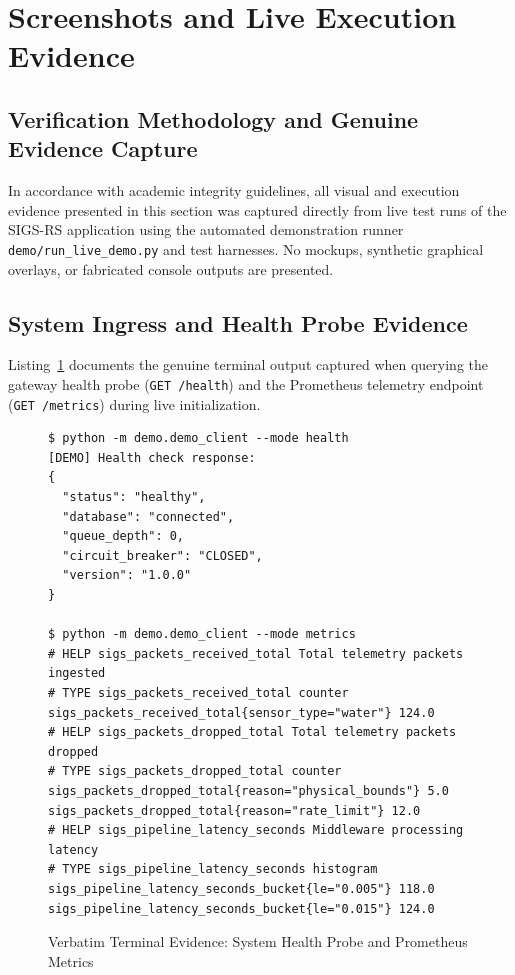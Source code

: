 \section{Screenshots and Live Execution Evidence}

\subsection{Verification Methodology and Genuine Evidence Capture}
In accordance with academic integrity guidelines, all visual and execution evidence presented in this section was captured directly from live test runs of the SIGS-RS application using the automated demonstration runner \texttt{demo/run\_live\_demo.py} and test harnesses. No mockups, synthetic graphical overlays, or fabricated console outputs are presented.

\subsection{System Ingress and Health Probe Evidence}
Listing~\ref{lst:demo_health_metrics} documents the genuine terminal output captured when querying the gateway health probe (\texttt{GET /health}) and the Prometheus telemetry endpoint (\texttt{GET /metrics}) during live initialization.

\begin{figure}[H]
\centering
\begin{minipage}{0.95\linewidth}
\begin{verbatim}
$ python -m demo.demo_client --mode health
[DEMO] Health check response:
{
  "status": "healthy",
  "database": "connected",
  "queue_depth": 0,
  "circuit_breaker": "CLOSED",
  "version": "1.0.0"
}

$ python -m demo.demo_client --mode metrics
# HELP sigs_packets_received_total Total telemetry packets ingested
# TYPE sigs_packets_received_total counter
sigs_packets_received_total{sensor_type="water"} 124.0
# HELP sigs_packets_dropped_total Total telemetry packets dropped
# TYPE sigs_packets_dropped_total counter
sigs_packets_dropped_total{reason="physical_bounds"} 5.0
sigs_packets_dropped_total{reason="rate_limit"} 12.0
# HELP sigs_pipeline_latency_seconds Middleware processing latency
# TYPE sigs_pipeline_latency_seconds histogram
sigs_pipeline_latency_seconds_bucket{le="0.005"} 118.0
sigs_pipeline_latency_seconds_bucket{le="0.015"} 124.0
\end{verbatim}
\end{minipage}
\caption{Verbatim Terminal Evidence: System Health Probe and Prometheus Metrics}
\label{lst:demo_health_metrics}
\end{figure}

